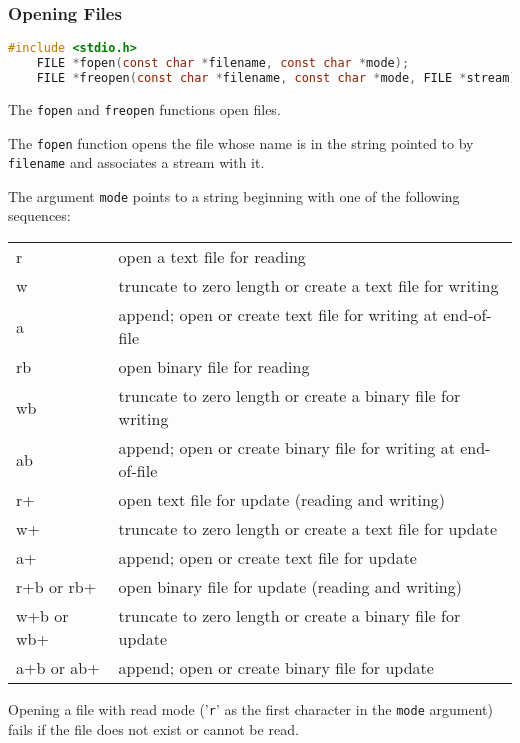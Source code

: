 \subsubsection{Opening Files}
\lstset{basicstyle=\scriptsize, numbers=left, captionpos=b, tabsize=4}
\begin{lstlisting}[caption=Section \thesection listing \arabic{filecnt},language={C},
breaklines=true,xleftmargin=15pt,label=lst:section\thesection listing\arabic{filecnt}]
	#include <stdio.h>
	FILE *fopen(const char *filename, const char *mode);
	FILE *freopen(const char *filename, const char *mode, FILE *stream);
\end{lstlisting}

The \texttt{fopen} and \texttt{freopen} functions open files.

The \texttt{fopen} function opens the file whose name is in the string pointed
to by \texttt{filename} and associates a stream with it.

The argument \texttt{mode} points to a string beginning with one of the
following sequences:

\begin{tabular}{l p{5.5cm}}
r          & open a text file for reading\\
w          & truncate to zero length or create a text file for writing\\
a          & append; open or create text file for writing at end-of-file\\
rb         & open binary file for reading\\
wb         & truncate to zero length or create a binary file for writing\\
ab         & append; open or create binary file for writing at end-of-file\\
r+         & open text file for update (reading and writing)\\
w+         & truncate to zero length or create a text file for update\\
a+         & append; open or create text file for update\\
r+b or rb+ & open binary file for update (reading and writing)\\
w+b or wb+ & truncate to zero length or create a binary file for update\\
a+b or ab+ & append; open or create binary file for update\\
\end{tabular}

Opening a file with read mode ('\texttt{r}' as the first character in the
\texttt{mode} argument) fails if the file does not exist or cannot be read.

